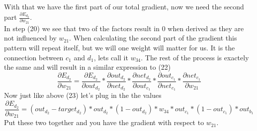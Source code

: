 \documentclass[11pt, halfparskip]{article}
\begin{document}
    
\noindent With that we have the first part of our total gradient, now we need the second part $\frac{\partial E_{d_2}}{\partial w_{21}}$.\\
In step (20) we see that two of the factors result in 0 when derived as they are not influenced by $w_{21}$. When calculating the second part of the gradient this pattern will repeat itself, but we will one weight will matter for us. It is the connection between $c_1$ and $d_1$, lets call it $w_{34}$.
The rest of the process is exactely the same and will result in a similar expression to (22)
    \begin{equation}
    	\frac{\partial E_{d_2}}{\partial w_{21}} = \frac{\partial E_{d_2}}{\partial out_{d_2}} * \frac{\partial out_{d_2}}{\partial net_{d_2}} * \frac{\partial net_{d_2}}{\partial 				out_{c_1}} * \frac{\partial out_{c_1}}{\partial net_{c_1}} * \frac{\partial net_{c_1}}{\partial w_{21}}
    \end{equation}
Now just like above (23) let's plug in the the values
    \begin{equation}
    	\frac{\partial E_{d_2}}{\partial w_{21}} = (out_{d_2} - target_{d_2}) * out_{d_2} * (1 - out_{d_2}) * w_{34} * out_{c_1} * (1 - out_{c_1}) * out_{b_1}
    \end{equation}
Put these two together and you have the gradient with respect to $w_{21}$.
\end{document}
